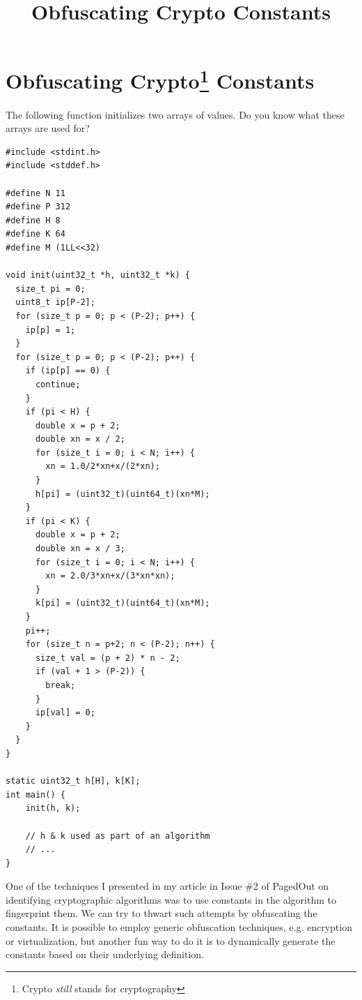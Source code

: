 \documentclass[twocolumn]{article}
\begin{document}
\title{Obfuscating Crypto Constants}
\date{}

\section*{Obfuscating Crypto\footnote{Crypto \emph{still} stands for cryptography} Constants}
\vspace*{-0.5\baselineskip}

The following function initializes two arrays of values. Do you know what these arrays are used for?

\begin{verbatim}
#include <stdint.h>
#include <stddef.h>

#define N 11
#define P 312
#define H 8
#define K 64
#define M (1LL<<32)

void init(uint32_t *h, uint32_t *k) {
  size_t pi = 0;
  uint8_t ip[P-2];
  for (size_t p = 0; p < (P-2); p++) {
    ip[p] = 1;
  }
  for (size_t p = 0; p < (P-2); p++) {
    if (ip[p] == 0) {
      continue;
    }
    if (pi < H) {
      double x = p + 2;
      double xn = x / 2;
      for (size_t i = 0; i < N; i++) {
        xn = 1.0/2*xn+x/(2*xn);
      }
      h[pi] = (uint32_t)(uint64_t)(xn*M);
    }
    if (pi < K) {
      double x = p + 2;
      double xn = x / 3;
      for (size_t i = 0; i < N; i++) {
        xn = 2.0/3*xn+x/(3*xn*xn);
      }
      k[pi] = (uint32_t)(uint64_t)(xn*M);
    }
    pi++;
    for (size_t n = p+2; n < (P-2); n++) {
      size_t val = (p + 2) * n - 2;
      if (val + 1 > (P-2)) {
        break;
      }
      ip[val] = 0;
    }
  }
}

static uint32_t h[H], k[K];
int main() {
    init(h, k);

    // h & k used as part of an algorithm
    // ...
}
\end{verbatim}

One of the techniques I presented in my article in Issue \#2 of PagedOut on identifying cryptographic algorithms was to use constants in the algorithm to fingerprint them. We can try to thwart such attempts by obfuscating the constants. It is possible to employ generic obfuscation techniques, e.g. encryption or virtualization, but another fun way to do it is to dynamically generate the constants based on their underlying definition.

\vspace*{-0.5\baselineskip}
\end{document}
